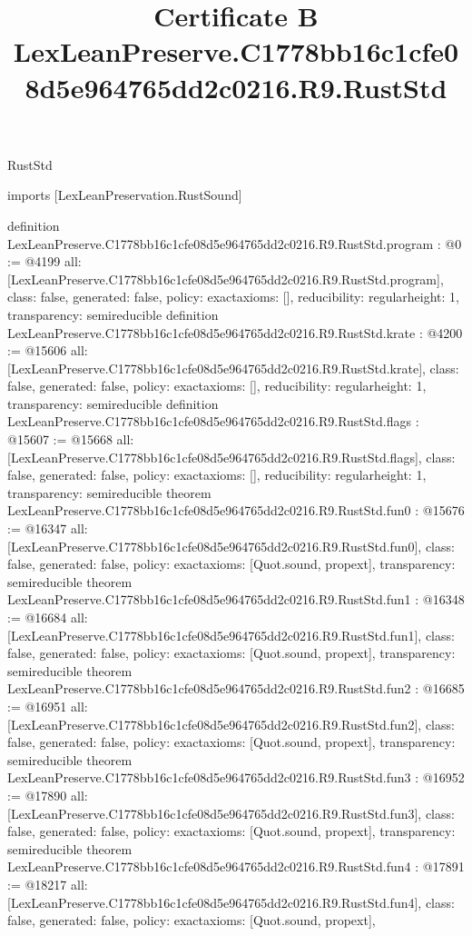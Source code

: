 \begin{lexlean}{RustStd}
\title{Certificate B LexLeanPreserve.C1778bb16c1cfe08d5e964765dd2c0216.R9.RustStd}
\begin{coremodule}
imports [LexLeanPreservation.RustSound]

definition LexLeanPreserve.C1778bb16c1cfe08d5e964765dd2c0216.R9.RustStd.program : @0 := @4199 {
  all: [LexLeanPreserve.C1778bb16c1cfe08d5e964765dd2c0216.R9.RustStd.program],
  class: false,
  generated: false,
  policy: exact{axioms: []},
  reducibility: regular{height: 1},
  transparency: semireducible
}
definition LexLeanPreserve.C1778bb16c1cfe08d5e964765dd2c0216.R9.RustStd.krate : @4200 := @15606 {
  all: [LexLeanPreserve.C1778bb16c1cfe08d5e964765dd2c0216.R9.RustStd.krate],
  class: false,
  generated: false,
  policy: exact{axioms: []},
  reducibility: regular{height: 1},
  transparency: semireducible
}
definition LexLeanPreserve.C1778bb16c1cfe08d5e964765dd2c0216.R9.RustStd.flags : @15607 := @15668 {
  all: [LexLeanPreserve.C1778bb16c1cfe08d5e964765dd2c0216.R9.RustStd.flags],
  class: false,
  generated: false,
  policy: exact{axioms: []},
  reducibility: regular{height: 1},
  transparency: semireducible
}
theorem LexLeanPreserve.C1778bb16c1cfe08d5e964765dd2c0216.R9.RustStd.fun0 : @15676 := @16347 {
  all: [LexLeanPreserve.C1778bb16c1cfe08d5e964765dd2c0216.R9.RustStd.fun0],
  class: false,
  generated: false,
  policy: exact{axioms: [Quot.sound, propext]},
  transparency: semireducible
}
theorem LexLeanPreserve.C1778bb16c1cfe08d5e964765dd2c0216.R9.RustStd.fun1 : @16348 := @16684 {
  all: [LexLeanPreserve.C1778bb16c1cfe08d5e964765dd2c0216.R9.RustStd.fun1],
  class: false,
  generated: false,
  policy: exact{axioms: [Quot.sound, propext]},
  transparency: semireducible
}
theorem LexLeanPreserve.C1778bb16c1cfe08d5e964765dd2c0216.R9.RustStd.fun2 : @16685 := @16951 {
  all: [LexLeanPreserve.C1778bb16c1cfe08d5e964765dd2c0216.R9.RustStd.fun2],
  class: false,
  generated: false,
  policy: exact{axioms: [Quot.sound, propext]},
  transparency: semireducible
}
theorem LexLeanPreserve.C1778bb16c1cfe08d5e964765dd2c0216.R9.RustStd.fun3 : @16952 := @17890 {
  all: [LexLeanPreserve.C1778bb16c1cfe08d5e964765dd2c0216.R9.RustStd.fun3],
  class: false,
  generated: false,
  policy: exact{axioms: [Quot.sound, propext]},
  transparency: semireducible
}
theorem LexLeanPreserve.C1778bb16c1cfe08d5e964765dd2c0216.R9.RustStd.fun4 : @17891 := @18217 {
  all: [LexLeanPreserve.C1778bb16c1cfe08d5e964765dd2c0216.R9.RustStd.fun4],
  class: false,
  generated: false,
  policy: exact{axioms: [Quot.sound, propext]},
}
\end{coremodule}
\end{lexlean}
